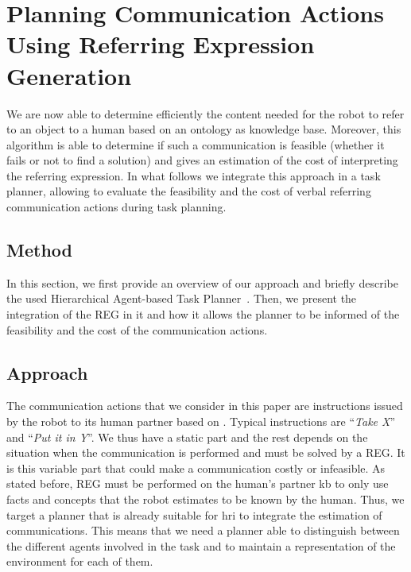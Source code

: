 \documentclass[a4paper,11pt,twoside]{StyleThese}
\begin{document}
\section{Planning Communication Actions Using Referring Expression Generation}

We are now able to determine efficiently the content needed for the robot to refer to an object to a human based on an ontology as knowledge base. Moreover, this algorithm is able to determine if such a communication is feasible (whether it fails or not to find a solution) and gives an estimation of the cost of interpreting the referring expression. In what follows we integrate this approach in a task planner, allowing to evaluate the feasibility and the cost of verbal referring communication actions during task planning.

\subsection{Method}
\label{sec:Integration}

In this section, we first provide an overview of our approach and briefly describe the used Hierarchical Agent-based Task Planner~\cite{lallement2014hatp}. Then, we present the integration of the REG in it and how it allows the planner to be informed of the feasibility and the cost of the communication actions.

\subsection{Approach}


The communication actions that we consider in this paper are instructions issued by the robot to its human partner based on . Typical instructions are ``\textit{Take X}'' and ``\textit{Put it in Y}''. We thus have a static part and the rest depends on the situation when the communication is performed and must be solved by a REG. It is this variable part that could make a communication costly or infeasible. As stated before, REG must be performed on the human's partner \acrfull{kb} to only use facts and concepts that the robot estimates to be known by the human. Thus, we target a planner that is already suitable for \acrshort{hri} to integrate the estimation of communications. This means that we need a planner able to distinguish between the different agents involved in the task and to maintain a representation of the environment for each of them.
\end{document}
